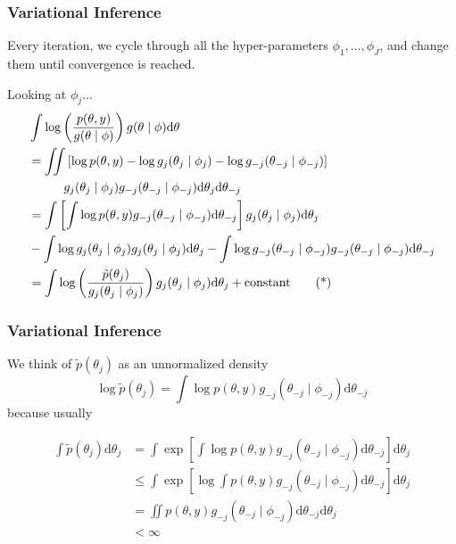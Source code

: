 \documentclass{beamer}
\begin{document}
\begin{frame}[fragile]
\frametitle{Variational Inference}

Every iteration, we cycle through all the hyper-parameters $\phi_1, \ldots, \phi_J$, and change them until convergence is reached.
\newline
\pause

Looking at $\phi_j$...
\begin{align*}
&\int \log \left( \frac{ p(\theta, y)}{g(\theta \mid \phi)} \right) g(\theta \mid \phi)\text{d}\theta \\
&=  \iint \left[\log p(\theta, y) - \log g_j(\theta_j \mid \phi_j) - \log g_{-j}(\theta_{-j} \mid \phi_{-j})\right]  \\
&\hspace{10mm} g_j(\theta_j \mid \phi_j)g_{-j}(\theta_{-j} \mid \phi_{-j})\text{d}\theta_{j}\text{d}\theta_{-j} \\
&=  \int \left[\int\log p(\theta, y)g_{-j}(\theta_{-j} \mid \phi_{-j}) \text{d}\theta_{-j}\right] g_j(\theta_j \mid \phi_j)\text{d}\theta_{j} \\
&- \int\log g_j(\theta_j \mid \phi_j)g_j(\theta_j \mid \phi_j)\text{d}\theta_j - \int \log g_{-j}(\theta_{-j} \mid \phi_{-j})g_{-j}(\theta_{-j} \mid \phi_{-j})\text{d}\theta_{-j} \\ 
&=  \int  \log \left(\frac{\tilde{p}(\theta_j)}{g_j(\theta_j \mid \phi_j)}  \right) g_j(\theta_j \mid \phi_j)\text{d}\theta_{j} + \text{constant} \tag{*}
\end{align*}

\end{frame}

\begin{frame}[fragile]
\frametitle{Variational Inference}

We think of $\tilde{p}(\theta_j)$ as an unnormalized density 
$$
\log\tilde{p}(\theta_j) = \int\log p(\theta, y)g_{-j}(\theta_{-j} \mid \phi_{-j}) \text{d}\theta_{-j}
$$
because usually

\begin{align*}
\int \tilde{p}(\theta_j) \text{d}\theta_j &= \int \exp\left[ \int\log p(\theta, y)g_{-j}(\theta_{-j} \mid \phi_{-j}) \text{d}\theta_{-j}\right] \text{d}\theta_j \\
&\le \int \exp\left[ \log \int p(\theta, y)g_{-j}(\theta_{-j} \mid \phi_{-j}) \text{d}\theta_{-j}\right] \text{d}\theta_j \tag{Jensen's}\\
&= \iint  p(\theta, y)g_{-j}(\theta_{-j} \mid \phi_{-j}) \text{d}\theta_{-j} \text{d}\theta_j \\
&< \infty
\end{align*}

\end{frame}
\end{document}

